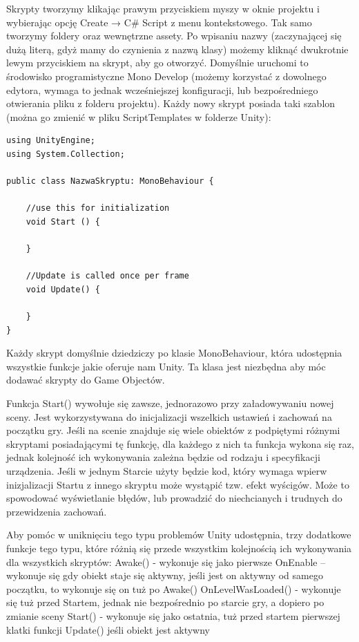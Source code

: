 \documentclass[brudnopis]{xmgr}
\begin{document}
Skrypty tworzymy klikając prawym przyciskiem myszy w oknie projektu i wybierając opcję  Create    → C\# Script z menu kontekstowego. Tak samo tworzymy foldery oraz wewnętrzne assety. Po wpisaniu nazwy (zaczynającej się dużą literą, gdyż mamy do czynienia z nazwą klasy) możemy kliknąć dwukrotnie lewym przyciskiem na skrypt, aby go otworzyć. Domyślnie uruchomi to środowisko programistyczne Mono Develop (możemy korzystać z dowolnego edytora, wymaga to jednak wcześniejszej konfiguracji, lub bezpośredniego otwierania pliku z folderu projektu). Każdy nowy skrypt posiada taki szablon (można go zmienić w pliku ScriptTemplates w folderze Unity):

\newpage
\begin{lstlisting}
using UnityEngine;
using System.Collection;

public class NazwaSkryptu: MonoBehaviour {

	//use this for initialization
	void Start () {

	}

	//Update is called once per frame
	void Update() {

	}
} 
\end{lstlisting}

Każdy skrypt domyślnie dziedziczy po klasie MonoBehaviour, która  udostępnia wszystkie funkcje jakie oferuje nam Unity. Ta klasa jest niezbędna aby móc dodawać skrypty do Game Objectów.

Funkcja Start() wywołuje się zawsze, jednorazowo przy załadowywaniu nowej sceny. Jest wykorzystywana do inicjalizacji wszelkich ustawień i zachowań na początku gry. Jeśli na scenie znajduje się wiele obiektów z podpiętymi różnymi skryptami posiadającymi tę funkcję, dla każdego  z nich ta funkcja wykona się raz, jednak kolejność ich wykonywania zależna będzie od rodzaju i specyfikacji urządzenia. Jeśli w jednym Starcie użyty będzie kod, który wymaga wpierw inizjalizacji Startu z innego skryptu może wystąpić tzw. efekt wyścigów. Może to spowodować wyświetlanie błędów, lub prowadzić do niechcianych i trudnych do przewidzenia zachowań.

Aby pomóc w uniknięciu tego typu problemów Unity udostępnia, trzy dodatkowe funkcje tego typu, które różnią się przede wszystkim kolejnością ich wykonywania dla wszystkich skryptów:
Awake() - wykonuje się jako pierwsze
OnEnable – wykonuje się gdy obiekt staje się aktywny, jeśli jest on aktywny od samego początku, to wykonuje się on tuż po Awake()
OnLevelWasLoaded() - wykonuje się tuż przed Startem, jednak nie bezpośrednio po starcie gry, a dopiero po zmianie sceny
Start() - wykonuje się jako ostatnia, tuż przed startem pierwszej klatki funkcji Update() jeśli obiekt jest aktywny
\end{document}
